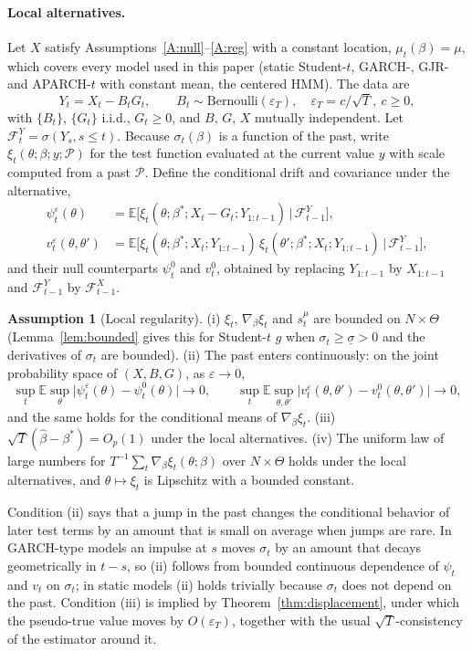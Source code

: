 \documentclass[11pt,a4paper]{article}
\theoremstyle{definition}
\newtheorem{assumption}{Assumption}
\theoremstyle{remark}
\newcommand{\E}{\mathbb{E}}
\newcommand{\F}{\mathcal{F}}
\begin{document}
\paragraph{Local alternatives.} Let $X$ satisfy Assumptions~\ref{A:null}--\ref{A:reg} with a constant location, $\mu_t(\beta)=\mu$, which covers every model used in this paper (static Student-$t$, GARCH-, GJR- and APARCH-$t$ with constant mean, the centered HMM). The data are
\[
Y_t=X_t-B_tG_t,\qquad B_t\sim\text{Bernoulli}(\varepsilon_T),\quad\varepsilon_T=c/\sqrt T,\ c\ge0,
\]
with $\{B_t\}$, $\{G_t\}$ i.i.d., $G_t\ge0$, and $B$, $G$, $X$ mutually independent. Let $\F^Y_t=\sigma(Y_s,s\le t)$. Because $\sigma_t(\beta)$ is a function of the past, write $\xi_t(\theta;\beta;y;\mathcal P)$ for the test function evaluated at the current value $y$ with scale computed from a past $\mathcal P$. Define the conditional drift and covariance under the alternative,
\[
\begin{aligned}
\psi^{\varepsilon}_t(\theta)&=\E\big[\xi_t(\theta;\beta^*;X_t-G_t;Y_{1:t-1})\,\big|\,\F^Y_{t-1}\big],\\
v^{\varepsilon}_t(\theta,\theta')&=\E\big[\xi_t(\theta;\beta^*;X_t;Y_{1:t-1})\,\xi_t(\theta';\beta^*;X_t;Y_{1:t-1})\,\big|\,\F^Y_{t-1}\big],
\end{aligned}
\]
and their null counterparts $\psi^0_t$ and $v^0_t$, obtained by replacing $Y_{1:t-1}$ by $X_{1:t-1}$ and $\F^Y_{t-1}$ by $\F^X_{t-1}$.

\begin{assumption}[Local regularity]\label{A:local}
(i) $\xi_t$, $\nabla_\beta\xi_t$ and $s^\mu_t$ are bounded on $N\times\Theta$ (Lemma~\ref{lem:bounded} gives this for Student-$t$ $g$ when $\sigma_t\ge\underline\sigma>0$ and the derivatives of $\sigma_t$ are bounded). (ii) The past enters continuously: on the joint probability space of $(X,B,G)$, as $\varepsilon\to0$,
\[
\sup_t\E\sup_{\theta}\big|\psi^{\varepsilon}_t(\theta)-\psi^0_t(\theta)\big|\to0,\qquad
\sup_t\E\sup_{\theta,\theta'}\big|v^{\varepsilon}_t(\theta,\theta')-v^0_t(\theta,\theta')\big|\to0,
\]
and the same holds for the conditional means of $\nabla_\beta\xi_t$. (iii) $\sqrt T(\hat\beta-\beta^*)=O_p(1)$ under the local alternatives. (iv) The uniform law of large numbers for $T^{-1}\sum_t\nabla_\beta\xi_t(\theta;\beta)$ over $N\times\Theta$ holds under the local alternatives, and $\theta\mapsto\xi_t$ is Lipschitz with a bounded constant.
\end{assumption}
\noindent Condition (ii) says that a jump in the past changes the conditional behavior of later test terms by an amount that is small on average when jumps are rare. In GARCH-type models an impulse at $s$ moves $\sigma_t$ by an amount that decays geometrically in $t-s$, so (ii) follows from bounded continuous dependence of $\psi_t$ and $v_t$ on $\sigma_t$; in static models (ii) holds trivially because $\sigma_t$ does not depend on the past. Condition (iii) is implied by Theorem~\ref{thm:displacement}, under which the pseudo-true value moves by $O(\varepsilon_T)$, together with the usual $\sqrt T$-consistency of the estimator around it.
\end{document}
